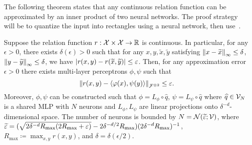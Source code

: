 The following theorem states that any continuous relation function can be approximated by an inner product of two neural networks. The proof strategy will be to quantize the input into rectangles using a neural network, then use~.

\begin{theorem}\label{theorem:asymemtric_inner_prod_rel_func_class}
    Suppose the relation function $r: {\mathcal{X}} \times {\mathcal{X}} \to \mathbb{R}$ is continuous. In particular, for any $\epsilon > 0$, there exists $\delta(\epsilon) > 0$ such that for any $x, y, \tilde{x}, \tilde{y}$ satisfying $\left\lVert x - \widetilde{x}\right\rVert_{\infty} \leq \delta$, $\left\lVert y - \widetilde{y}\right\rVert_{\infty} \leq \delta$, we have $\left\lvert r(x, y) - r(\widetilde{x}, \widetilde{y})\right\rvert \leq \varepsilon$. Then, for any approximation error $\epsilon > 0$ there exists multi-layer perceptrons $\phi, \psi$ such that
    \begin{equation*}
        \norm{r(x,y) - \iprod{\phi(x)}{\psi(y)}}_{\calF^{\otimes 2}} \leq \epsilon.
    \end{equation*}
    Moreover, $\phi, \psi$ can be constructed such that $\phi = L_\phi \circ \hat{q}$, $\psi = L_\psi \circ \hat{q}$ where $\widehat{q} \in {\mathcal{V}}_N$ is a shared MLP with $N$ neurons and $L_\phi, L_\psi$ are linear projections onto $\delta^{-d}$-dimensional space. The number of neurons is bounded by $N = {\mathcal{N}}(\widetilde{\varepsilon}; {\mathcal{V}})$, where $\widetilde{\varepsilon} = (\sqrt{2 \delta^{-d} R_{\max} (2 R_{\max} + \varepsilon)} - 2 \delta^{-d / 2} R_{\max}) (2 \delta^{-d} R_{\max})^{-1}$,
    $R_{\max} \coloneq \max_{x,y} r(x,y)$, and $\delta = \delta(\epsilon / 2)$.
\end{theorem}
